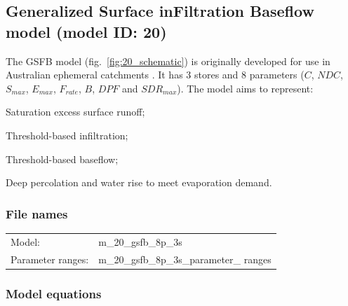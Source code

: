 \subsection{Generalized Surface inFiltration Baseflow model (model ID: 20)}
The GSFB model (fig.~\ref{fig:20_schematic}) is  originally developed for use in Australian ephemeral catchments \citep{Nathan1990,Ye1997}. It has 3 stores and 8 parameters ($C$, $NDC$, $S_{max}$, $E_{max}$, $F_{rate}$, $B$, $DPF$ and $SDR_{max}$). The model aims to represent:

\begin{itemizecompact}
\item Saturation excess surface runoff;
\item Threshold-based infiltration;
\item Threshold-based baseflow;
\item Deep percolation and water rise to meet evaporation demand.
\end{itemizecompact}

\subsubsection{File names}
\begin{tabular}{@{}ll}
Model: &m\_20\_gsfb\_8p\_3s \\
Parameter ranges: &m\_20\_gsfb\_8p\_3s\_parameter\_ ranges \\
\end{tabular}

\subsubsection{Model equations}

